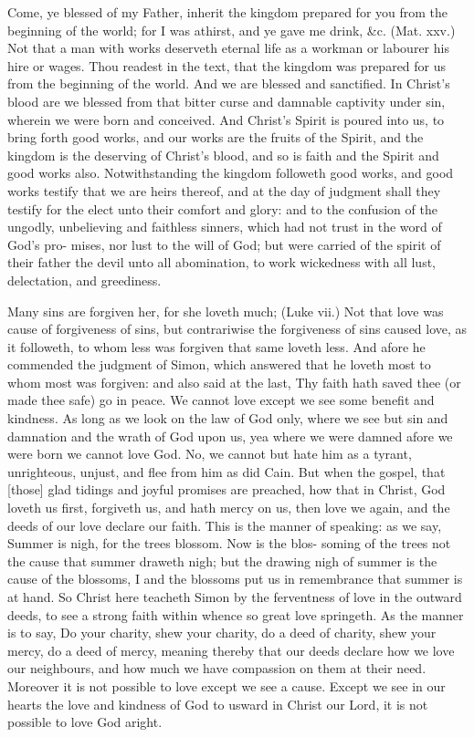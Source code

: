 Come, ye blessed of my Father, inherit the kingdom 
prepared for you from the beginning of the world; for I 
was athirst, and ye gave me drink, \&c. (Mat. xxv.) Not
that a man with works deserveth eternal life as a workman 
or labourer his hire or wages. Thou readest in the text, 
that the kingdom was prepared for us from the beginning of 
the world. And we are blessed and sanctified. In Christ's 
blood are we blessed from that bitter curse and damnable 
captivity under sin, wherein we were born and conceived. 
And Christ's Spirit is poured into us, to bring forth good 
works, and our works are the fruits of the Spirit, and the 
kingdom is the deserving of Christ's blood, and so is faith 
and the Spirit and good works also. Notwithstanding the 
kingdom followeth good works, and good works testify that 
we are heirs thereof, and at the day of judgment shall they 
testify for the elect unto their comfort and glory: and to 
the confusion of the ungodly, unbelieving and faithless 
sinners, which had not trust in the word of God's pro- 
mises, nor lust to the will of God; but were carried of 
the spirit of their father the devil unto all abomination, to 
work wickedness with all lust, delectation, and greediness. 

Many sins are forgiven her, for she loveth much; 
(Luke vii.) Not that love was cause of forgiveness of sins,
but contrariwise the forgiveness of sins caused love, as it 
followeth, to whom less was forgiven that same loveth less. 
And afore he commended the judgment of Simon, which 
answered that he loveth most to whom most was forgiven: 
and also said at the last, Thy faith hath saved thee (or 
made thee safe) go in peace. We cannot love except we 
see some benefit and kindness. As long as we look on
the law of God only, where we see but sin and damnation
and the wrath of God upon us, yea where we were damned 
afore we were born we cannot love God. No, we cannot 
but hate him as a tyrant, unrighteous, unjust, and 
flee from him as did Cain. But when the gospel, that [those] 
glad tidings and joyful promises are preached, how that in 
Christ, God loveth us first, forgiveth us, and hath mercy on 
us, then love we again, and the deeds of our love declare 
our faith. This is the manner of speaking: as we say, 
Summer is nigh, for the trees blossom. Now is the blos- 
soming of the trees not the cause that summer draweth 
nigh; but the drawing nigh of summer is the cause of 
the blossoms, I and the blossoms put us in remembrance 
that summer is at hand. So Christ here teacheth Simon 
by the ferventness of love in the outward deeds, to see a 
strong faith within whence so great love springeth. As 
the manner is to say, Do your charity, shew your charity, 
do a deed of charity, shew your mercy, do a deed of mercy, 
meaning thereby that our deeds declare how we love our 
neighbours, and how much we have compassion on them 
at their need. Moreover it is not possible to love except 
we see a cause. Except we see in our hearts the love and 
kindness of God to usward in Christ our Lord, it is not 
possible to love God aright. 


